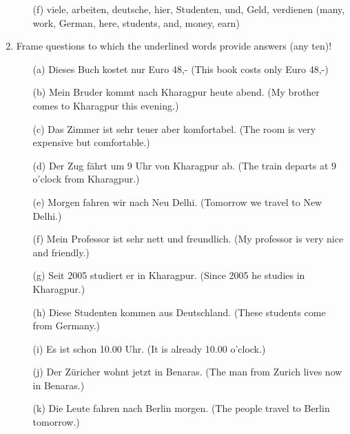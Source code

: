 \documentclass{article}
\begin{document}
\begin{enumerate}
\begin{enumerate}
        \item[(f)] viele, arbeiten, deutsche, hier, Studenten, und, Geld, verdienen (many, work, German, here, students, and, money, earn)
    \end{enumerate}
    \item Frame questions to which the underlined words provide answers (any ten)!
    \begin{enumerate}
        \item[(a)] Dieses Buch kostet nur Euro 48,- (This book costs only Euro 48,-)
        \item[(b)] Mein Bruder kommt nach Kharagpur heute abend. (My brother comes to Kharagpur this evening.)
        \item[(c)] Das Zimmer ist sehr teuer aber komfortabel. (The room is very expensive but comfortable.)
        \item[(d)] Der Zug fährt um 9 Uhr von Kharagpur ab. (The train departs at 9 o'clock from Kharagpur.)
        \item[(e)] Morgen fahren wir nach Neu Delhi. (Tomorrow we travel to New Delhi.)
        \item[(f)] Mein Professor ist sehr nett und freundlich. (My professor is very nice and friendly.)
        \item[(g)] Seit 2005 studiert er in Kharagpur. (Since 2005 he studies in Kharagpur.)
        \item[(h)] Diese Studenten kommen aus Deutschland. (These students come from Germany.)
        \item[(i)] Es ist schon 10.00 Uhr. (It is already 10.00 o'clock.)
        \item[(j)] Der Züricher wohnt jetzt in Benaras. (The man from Zurich lives now in Benaras.)
        \item[(k)] Die Leute fahren nach Berlin morgen. (The people travel to Berlin tomorrow.)
    \end{enumerate}
\end{enumerate}
\end{document}

